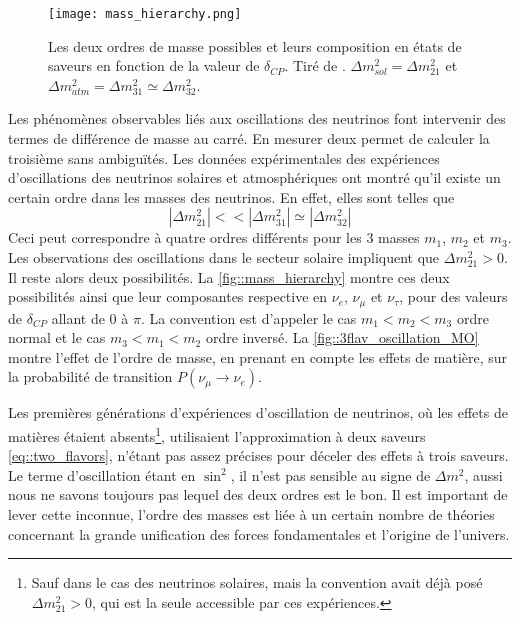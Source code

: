         \begin{figure}[htpb]
          \centering
          \texttt{[image: mass\_hierarchy.png]}
          \caption[Les deux ordres de masse possibles]{\label{fig::mass_hierarchy}Les deux ordres de masse possibles et leurs composition en états de saveurs en fonction de la valeur de $\delta_{CP}$. Tiré de \cite{Qian2015}. $\Delta m^2_{sol}=\Delta m^2_{21}$ et $\Delta m^2_{atm}=\Delta m^2_{31}\simeq\Delta m^2_{32}$.}
        \end{figure}
        Les phénomènes observables liés aux oscillations des neutrinos font intervenir des termes de différence de masse au carré. En mesurer deux permet de calculer la troisième sans ambiguïtés. Les données expérimentales des expériences d'oscillations des neutrinos solaires et atmosphériques ont montré qu'il existe un certain ordre dans les masses des neutrinos. En effet, elles sont telles que
        \begin{equation}\label{eq::mass_hierarchy}
          |\Delta m^2_{21}| <<|\Delta m^2_{31}| \simeq |\Delta m^2_{32}| 
        \end{equation}
        Ceci peut correspondre à quatre ordres différents pour les 3 masses $m_1$, $m_2$ et $m_3$. Les observations des oscillations dans le secteur solaire impliquent que $\Delta m^2_{21} > 0$\cite{pdg2018}. Il reste alors deux possibilités. La \autoref{fig::mass_hierarchy} montre ces deux possibilités ainsi que leur composantes respective en $\nu_e$, $\nu_{\mu}$ et $\nu_{\tau}$, pour des valeurs de $\delta_{CP}$ allant de 0 à $\pi$\cite{Qian2015}. La convention est d'appeler le cas $m_1 < m_2 < m_3$ ordre normal et le cas $m_3 < m_1 < m_2$ ordre inversé. La \autoref{fig::3flav_oscillation_MO} montre l'effet de l'ordre de masse, en prenant en compte les effets de matière, sur la probabilité de transition $P(\nu_{\mu}\to\nu_e)$.
        
        Les premières générations d'expériences d'oscillation de neutrinos, où les effets de matières étaient absents\footnote{Sauf dans le cas des neutrinos solaires, mais la convention avait déjà posé $\Delta m^2_{21} > 0$, qui est la seule accessible par ces expériences.}, utilisaient l'approximation à deux saveurs \eqref{eq::two_flavors}, n'étant pas assez précises pour déceler des effets à trois saveurs. Le terme d'oscillation étant en $\sin^2$, il n'est pas sensible au signe de $\Delta m^2$, aussi nous ne savons toujours pas lequel des deux ordres est le bon. Il est important de lever cette inconnue, l'ordre des masses est liée à un certain nombre de théories concernant la grande unification des forces fondamentales et l'origine de l'univers\cite{KH-website}.
        
